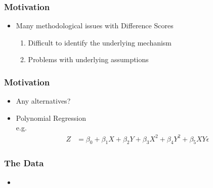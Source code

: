 \documentclass{beamer}\usepackage[]{graphicx}\usepackage[]{color}
\begin{document}
\begin{frame}
\frametitle{Motivation}
\begin{itemize}
  \item Many methodological issues with Difference Scores
  \begin{enumerate}
    \item Difficult to identify the underlying mechanism
    \item Problems with underlying assumptions
  \end{enumerate}
\end{itemize}
\end{frame}


\begin{frame}
\frametitle{Motivation}
\begin{itemize}
  \item Any alternatives?
  \item Polynomial Regression \\ e.g.
  \begin{align}
    Z &= \beta_0 + \beta_1 X + \beta_2 Y + \beta_3 X^2 + \beta_4 Y^2 + \beta_5 XY \epsilon
  \end{align}
\end{itemize}
\end{frame}



\begin{frame}
\frametitle{The Data}
\begin{itemize}
  \item 
\end{itemize}
\end{frame}
\end{document}
